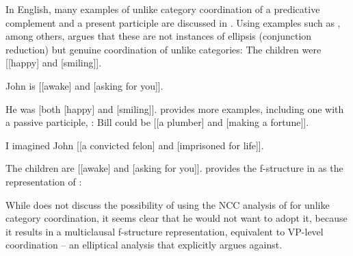 \documentclass[output=paper]{../langscibook}
\begin{document}
In English, many examples of unlike category coordination of a
predicative complement and a present participle are discussed in
\citet{pete:81}. Using examples such as
, among others, \citet{pete:81} argues that these are not instances of
ellipsis (conjunction reduction) but genuine coordination of
unlike categories:
\ea\label{ex:pete:81:9} The children were [[happy] and [smiling]]. \hfill\citep[(9)]{pete:81}
  \item\label{ex:pete:81:10} John is [[awake] and [asking for you]]. \hfill\citep[(10)]{pete:81}
  \item\label{ex:pete:81:27} He was [both [happy] and [smiling]]. \hfill\citep[(27)]{pete:81}
\z
\citet{pete:04} provides more examples, including one with a passive
participle, :
\ea\label{ex:pete:04:8c} Bill could be [[a plumber] and [making a fortune]]. \hfill\citep[(8c)]{pete:04}
  \item\label{ex:pete:04:8g} I imagined John [[a convicted felon] and
    [imprisoned for life]].\\ \hspace*{\fill} \citep[(8g)]{pete:04}
  \item\label{ex:pete:04:45} The children are [[awake] and [asking for you]]. \hfill\citep[(45)]{pete:04}
\z
\citet{pete:04} provides the f-structure in  as
the representation of :
~ \hfill  \citep[(47)]{pete:04}\smallskip

\noindent
While \citet{pete:04} does not discuss the possibility of using the
NCC analysis of \citet{max:man:96} for unlike category coordination,
it seems clear that he would not want to adopt it, because it results
in a multiclausal f-structure representation, equivalent to VP-level coordination –
an elliptical analysis that \citet{pete:04} explicitly argues
against.
\end{document}
